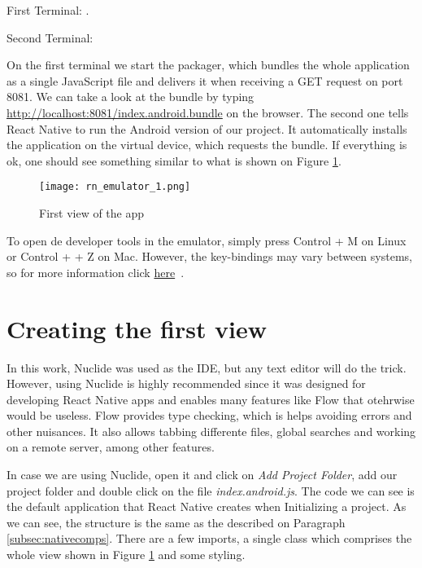 \begin{description}
 \item First Terminal: .
 \item Second Terminal: 
\end{description}

On the first terminal we start the packager, which bundles the whole application as a single JavaScript file and delivers it when receiving a GET request on port 8081. We can take a look at the bundle by typing \url{http://localhost:8081/index.android.bundle} on the browser. The second one tells React Native to run the Android version of our project. It automatically installs the application on the virtual device, which requests the bundle. If everything is ok, one should see something similar to what is shown on Figure \ref{fig:rnemulator1}.

\begin{figure}[H]
	\centering
	\texttt{[image: rn\_emulator\_1.png]}
	\caption{First view of the app\label{fig:rnemulator1}}
\end{figure}

To open de developer tools in the emulator, simply press Control + M on Linux or Control + \cmdkey + Z on Mac. However, the key-bindings may vary between systems, so for more information click \href{https://facebook.github.io/react-native/docs/debugging.html}{here}~\cite{opendevtools}.

\section{Creating the first view}

In this work, Nuclide was used as the IDE, but any text editor will do the trick. However, using Nuclide is highly recommended since it was designed for developing React Native apps and enables many features like Flow that otehrwise would be useless. Flow provides type checking, which is helps avoiding errors and other nuisances. It also allows tabbing differente files, global searches and working on a remote server, among other features.

In case we are using Nuclide, open it and click on \textit{Add Project Folder}, add our project folder and double click on the file \textit{index.android.js}. The code we can see is the default application that React Native creates when Initializing a project. As we can see, the structure is the same as the described on Paragraph \ref{subsec:nativecomps}. There are a few imports, a single class which comprises the whole view shown in Figure \ref{fig:rnemulator1} and some styling.

